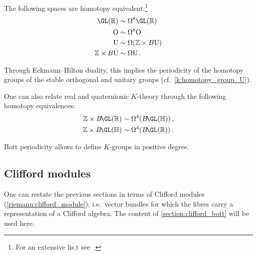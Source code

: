     \begin{theorem}
        The following spaces are homotopy equivalent:\footnote{For an extensive lis,t see~\citet{karoubi_k-theory_1978}.}
        \begin{gather}
            \begin{aligned}
                \GL(\mathbb{R})&\sim\Omega^8\GL(\mathbb{R})\\
                \mathrm{O}&\sim\Omega^8\mathrm{O}\\
                \mathrm{U}&\sim\Omega(\mathbb{Z}\times B\mathrm{U})\\
                \mathbb{Z}\times B\mathrm{U}&\sim\Omega\mathrm{U}\,.
            \end{aligned}
        \end{gather}
    \end{theorem}
    \begin{result}
        Through Eckmann--Hilton duality, this implies the periodicity of the homotopy groups of the stable orthogonal and unitary groups (cf.~\cref{k:homotopy_group_U}).
    \end{result}
    \begin{property}
        One can also relate real and quaternionic $K$-theory through the following homotopy equivalences:
        \begin{gather}
            \begin{aligned}
                \mathbb{Z}\times B\!\GL(\mathbb{R})&\sim\Omega^4(B\!\GL(\mathbb{H}))\,,\\
                \mathbb{Z}\times B\!\GL(\mathbb{H})&\sim\Omega^4(B\!\GL(\mathbb{R}))\,.
            \end{aligned}
        \end{gather}
    \end{property}

    \begin{remark}
        Bott periodicity allows to define $K$-groups in positive degree.
    \end{remark}

\subsection{Clifford modules}

    One can restate the previous sections in terms of Clifford modules (\cref{riemann:clifford_module}), i.e.~vector bundles for which the fibres carry a representation of a Clifford algebra. The content of \cref{section:clifford_bott} will be used here.

